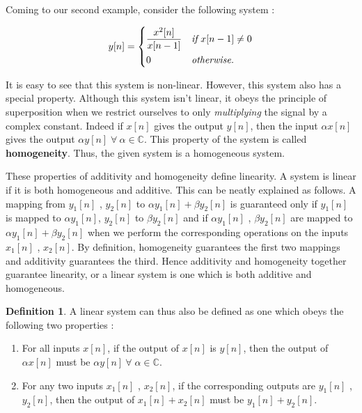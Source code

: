 \documentclass{article}
\theoremstyle{definition}
\newtheorem{defn}[theorem]{Definition}
\begin{document}
Coming to our second example, consider the following system : 

\[
	 	y[n] = 
	 	\begin{dcases}
        \frac{x^2[n]}{x[n-1]} & \emph{if} \ x[n-1] \neq 0 \\
        0 & \emph{otherwise.} \\
   		\end{dcases}
	 \]
	 
	 It is easy to see that this system is non-linear. However, this system also has a special property. Although this system isn't linear, it obeys the principle of superposition when we restrict ourselves to only \textit{multiplying} the signal by a complex constant. Indeed if $x[n]$ gives the output $y[n]$, then the input $\alpha x[n]$ gives the output $\alpha y[n] \; \forall \: \alpha \in \mathbb{C}$. This property of the system is called \textbf{homogeneity}. Thus, the given system is a homogeneous system. \smallskip
	 
	 These properties of additivity and homogeneity define linearity. A system is linear if it is both homogeneous and additive. This can be neatly explained as follows. A mapping from $y_1[n]$ , $y_2[n]$ to $\alpha y_1[n] + \beta y_2[n]$ is guaranteed only if $y_1[n]$ is mapped to $\alpha y_1[n]$, $y_2[n]$ to $\beta y_2[n]$ and if $\alpha y_1[n]$ , $\beta y_2[n]$ are mapped to $\alpha y_1[n] + \beta y_2[n]$ when we perform the corresponding operations on the inputs $x_1[n]$ , $x_2[n]$. By definition, homogeneity guarantees the first two mappings and additivity guarantees the third. Hence additivity and homogeneity together guarantee linearity, or a linear system is one which is both additive and homogeneous. 

\begin{defn}	 
	 A linear system can thus also be defined as one which obeys the following two properties : 
	 
	 \begin{enumerate}
	 \item For all inputs $x[n]$, if the output of $x[n]$ is $y[n]$, then the output of $\alpha x[n]$ must be $\alpha y[n] \: \forall \; \alpha \in \mathbb{C}$.
	 \item For any two inputs $x_1[n]$ , $x_2[n]$, if the corresponding outputs are $y_1[n]$ , $y_2[n]$, then the output of $x_1[n] + x_2[n]$ must be $y_1[n] + y_2[n]$.
	 \end{enumerate}
	 
	 \end{defn}
	 
\end{document}
